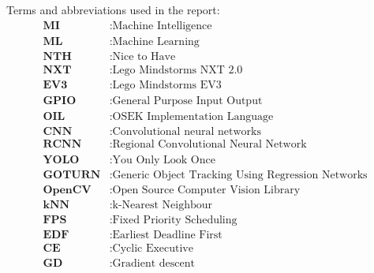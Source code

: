 
Terms and abbreviations used in the report:
\begin{align*}
    \textbf{MI} &: \text{Machine Intelligence} \\
    \textbf{ML} &: \text{Machine Learning} \\
    \textbf{NTH} &: \text{Nice to Have} \\
    \textbf{NXT} &: \text{Lego Mindstorms NXT 2.0} \\
    \textbf{EV3} &: \text{Lego Mindstorms EV3} \\  
    \textbf{GPIO} &: \text{General Purpose Input Output} \\
    \textbf{OIL} &: \text{OSEK Implementation Language} \\
    \textbf{CNN} &: \text{Convolutional neural networks} \\ 
    \textbf{RCNN} &: \text{Regional Convolutional Neural Network} \\ 
    \textbf{YOLO} &: \text{You Only Look Once} \\ 
    \textbf{GOTURN} &: \text{Generic Object Tracking Using Regression Networks} \\
    \textbf{OpenCV} &: \text{Open Source Computer Vision Library} \\
    \textbf{kNN} &: \text{k-Nearest Neighbour} \\
    \textbf{FPS} &: \text{Fixed Priority Scheduling} \\
    \textbf{EDF} &: \text{Earliest Deadline First} \\
    \textbf{CE} &: \text{Cyclic Executive} \\
    \textbf{GD} &: \text{Gradient descent} \\
\end{align*}
